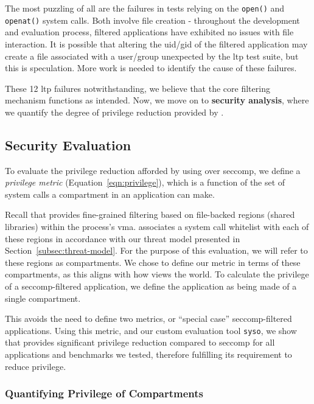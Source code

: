 The most puzzling of all are the failures in tests relying on the 
\texttt{open()} and \texttt{openat()} system calls. Both involve file creation -
throughout the development and evaluation process, filtered applications have
exhibited no issues with file interaction. It is possible that altering the
\ac{uid}/\ac{gid} of the filtered application may create a file associated with
a user/group unexpected by the \ac{ltp} test suite, but this is speculation.
More work is needed to identify the cause of these failures.

These 12 \ac{ltp} failures notwithstanding, we believe that the core filtering
mechanism functions as intended. Now, we move on to \textbf{security analysis},
where we quantify the degree of privilege reduction provided by \af.

\subsection{Security Evaluation}\label{subsec:security-eval}

To evaluate the privilege reduction afforded by using \af over seccomp, we
define a \textit{privilege metric} (Equation~\ref{eqn:privilege}), which is
a function of the set of system calls a compartment in an application can make.

Recall that \af provides fine-grained filtering based on file-backed
regions (shared libraries) within the process's \ac{vma}. \af associates a 
system call whitelist with each of these regions in accordance with our threat
model presented in Section~\ref{subsec:threat-model}. For the purpose of this
evaluation, we will refer to these regions as compartments. We chose to
define our metric in terms of these compartments, as this aligns with how \af
views the world. To calculate the privilege of a seccomp-filtered application,
we define the application as being made of a single compartment. 

This avoids the need to define two metrics, or ``special case'' 
seccomp-filtered applications.  Using this metric, and our custom evaluation
tool \texttt{syso}, we show that \af provides significant privilege
reduction compared to seccomp  for all applications and benchmarks we tested,
therefore fulfilling its requirement to reduce privilege.
 
\subsubsection{Quantifying Privilege of
Compartments}\label{subsubsec:eval-quant-privilege}

